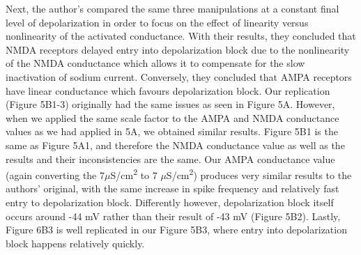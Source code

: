 Next, the author’s compared the same three manipulations at a constant final level of depolarization in order to focus on the effect of linearity versus nonlinearity of the activated conductance. With their results, they concluded that NMDA receptors delayed entry into depolarization block due to the nonlinearity of the NMDA conductance which allows it to compensate for the slow inactivation of sodium current. Conversely, they concluded that AMPA receptors have linear conductance which favours depolarization block.  Our replication (Figure 5B1-3) originally had the same issues as seen in Figure 5A. However, when we applied the same scale factor to the AMPA and NMDA conductance values as we had applied in 5A, we obtained similar results. Figure 5B1 is the same as Figure 5A1, and therefore the NMDA conductance value as well as the results and their inconsistencies are the same. Our AMPA conductance value (again converting the 7$\mu$S/cm\textsuperscript{2} to 7 $\mu$S/cm\textsuperscript{2}) produces very similar results to the authors' original, with the same increase in spike frequency and relatively fast entry to depolarization block. Differently however, depolarization block itself occurs around -44 mV rather than their result of -43 mV (Figure 5B2). Lastly, Figure 6B3 is well replicated in our Figure 5B3, where entry into depolarization block happens relatively quickly.

